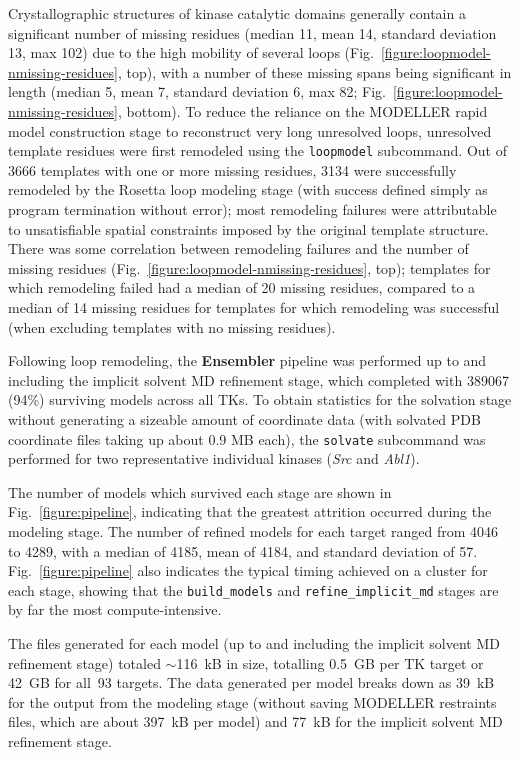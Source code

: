 \documentclass[aps,prl,preprint,nofootinbib,superscriptaddress,linenumbers]{revtex4-1}
\begin{document}
Crystallographic structures of kinase catalytic domains generally contain a significant number of missing residues (median 11, mean 14, standard deviation 13, max 102) due to the high mobility of several loops (Fig.~\ref{figure:loopmodel-nmissing-residues}, top), with a number of these missing spans being significant in length (median 5, mean 7, standard deviation 6, max 82; Fig.~\ref{figure:loopmodel-nmissing-residues}, bottom).
To reduce the reliance on the MODELLER rapid model construction stage to reconstruct very long unresolved loops, unresolved template residues were first remodeled using the {\tt loopmodel} subcommand.
Out of \num{3666} templates with one or more missing residues, \num{3134} were successfully remodeled by the Rosetta loop modeling stage (with success defined simply as program termination without error); most remodeling failures were attributable to unsatisfiable spatial constraints imposed by the original template structure.
There was some correlation between remodeling failures and the number of missing residues (Fig.~\ref{figure:loopmodel-nmissing-residues}, top); templates for which remodeling failed had a median of 20 missing residues, compared to a median of 14 missing residues for templates for which remodeling was successful (when excluding templates with no missing residues).

Following loop remodeling, the {\bf Ensembler} pipeline was performed up to and including the implicit solvent MD refinement stage, which completed with \num{389067} (94\%) surviving models across all TKs.
To obtain statistics for the solvation stage without generating a sizeable amount of coordinate data (with solvated PDB coordinate files taking up about 0.9 MB each), the {\tt solvate} subcommand was performed for two representative individual kinases (\emph{Src} and \emph{Abl1}).

The number of models which survived each stage are shown in Fig.~\ref{figure:pipeline}, indicating that the greatest attrition occurred during the modeling stage.
The number of refined models for each target ranged from \num{4046} to \num{4289}, with a median of \num{4185}, mean of \num{4184}, and standard deviation of \num{57}.
Fig.~\ref{figure:pipeline} also indicates the typical timing achieved on a cluster for each stage, showing that the {\tt build\_models} and {\tt refine\_implicit\_md} stages are by far the most compute-intensive.

The files generated for each model (up to and including the implicit solvent MD refinement stage) totaled $\sim$116~kB in size, totalling 0.5~GB per TK target or 42~GB for all~93 targets.
The data generated per model breaks down as 39~kB for the output from the modeling stage (without saving MODELLER restraints files, which are about 397~kB per model) and 77~kB for the implicit solvent MD refinement stage.
\end{document}
